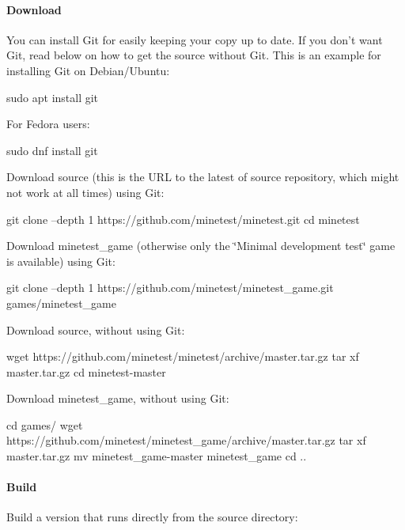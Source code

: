 \paragraph*{Download}

You can install Git for easily keeping your copy up to date. If you don’t want Git, read below on how to get the source without Git. This is an example for installing Git on Debian/\+Ubuntu\+: \begin{DoxyVerb}sudo apt install git
\end{DoxyVerb}


For Fedora users\+: \begin{DoxyVerb}sudo dnf install git
\end{DoxyVerb}


Download source (this is the U\+RL to the latest of source repository, which might not work at all times) using Git\+: \begin{DoxyVerb}git clone --depth 1 https://github.com/minetest/minetest.git
cd minetest
\end{DoxyVerb}


Download minetest\+\_\+game (otherwise only the \char`\"{}\+Minimal development test\char`\"{} game is available) using Git\+: \begin{DoxyVerb}git clone --depth 1 https://github.com/minetest/minetest_game.git games/minetest_game
\end{DoxyVerb}


Download source, without using Git\+: \begin{DoxyVerb}wget https://github.com/minetest/minetest/archive/master.tar.gz
tar xf master.tar.gz
cd minetest-master
\end{DoxyVerb}


Download minetest\+\_\+game, without using Git\+: \begin{DoxyVerb}cd games/
wget https://github.com/minetest/minetest_game/archive/master.tar.gz
tar xf master.tar.gz
mv minetest_game-master minetest_game
cd ..
\end{DoxyVerb}


\paragraph*{Build}

Build a version that runs directly from the source directory\+: 


